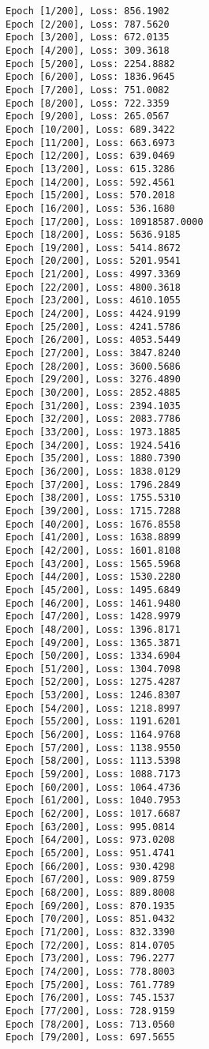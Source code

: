 \documentclass[11pt]{article}
\begin{document}
    \begin{Verbatim}[commandchars=\\\{\}]
Epoch [1/200], Loss: 856.1902
Epoch [2/200], Loss: 787.5620
Epoch [3/200], Loss: 672.0135
Epoch [4/200], Loss: 309.3618
Epoch [5/200], Loss: 2254.8882
Epoch [6/200], Loss: 1836.9645
Epoch [7/200], Loss: 751.0082
Epoch [8/200], Loss: 722.3359
Epoch [9/200], Loss: 265.0567
Epoch [10/200], Loss: 689.3422
Epoch [11/200], Loss: 663.6973
Epoch [12/200], Loss: 639.0469
Epoch [13/200], Loss: 615.3286
Epoch [14/200], Loss: 592.4561
Epoch [15/200], Loss: 570.2018
Epoch [16/200], Loss: 536.1680
Epoch [17/200], Loss: 10918587.0000
Epoch [18/200], Loss: 5636.9185
Epoch [19/200], Loss: 5414.8672
Epoch [20/200], Loss: 5201.9541
Epoch [21/200], Loss: 4997.3369
Epoch [22/200], Loss: 4800.3618
Epoch [23/200], Loss: 4610.1055
Epoch [24/200], Loss: 4424.9199
Epoch [25/200], Loss: 4241.5786
Epoch [26/200], Loss: 4053.5449
Epoch [27/200], Loss: 3847.8240
Epoch [28/200], Loss: 3600.5686
Epoch [29/200], Loss: 3276.4890
Epoch [30/200], Loss: 2852.4885
Epoch [31/200], Loss: 2394.1035
Epoch [32/200], Loss: 2083.7786
Epoch [33/200], Loss: 1973.1885
Epoch [34/200], Loss: 1924.5416
Epoch [35/200], Loss: 1880.7390
Epoch [36/200], Loss: 1838.0129
Epoch [37/200], Loss: 1796.2849
Epoch [38/200], Loss: 1755.5310
Epoch [39/200], Loss: 1715.7288
Epoch [40/200], Loss: 1676.8558
Epoch [41/200], Loss: 1638.8899
Epoch [42/200], Loss: 1601.8108
Epoch [43/200], Loss: 1565.5968
Epoch [44/200], Loss: 1530.2280
Epoch [45/200], Loss: 1495.6849
Epoch [46/200], Loss: 1461.9480
Epoch [47/200], Loss: 1428.9979
Epoch [48/200], Loss: 1396.8171
Epoch [49/200], Loss: 1365.3871
Epoch [50/200], Loss: 1334.6904
Epoch [51/200], Loss: 1304.7098
Epoch [52/200], Loss: 1275.4287
Epoch [53/200], Loss: 1246.8307
Epoch [54/200], Loss: 1218.8997
Epoch [55/200], Loss: 1191.6201
Epoch [56/200], Loss: 1164.9768
Epoch [57/200], Loss: 1138.9550
Epoch [58/200], Loss: 1113.5398
Epoch [59/200], Loss: 1088.7173
Epoch [60/200], Loss: 1064.4736
Epoch [61/200], Loss: 1040.7953
Epoch [62/200], Loss: 1017.6687
Epoch [63/200], Loss: 995.0814
Epoch [64/200], Loss: 973.0208
Epoch [65/200], Loss: 951.4741
Epoch [66/200], Loss: 930.4298
Epoch [67/200], Loss: 909.8759
Epoch [68/200], Loss: 889.8008
Epoch [69/200], Loss: 870.1935
Epoch [70/200], Loss: 851.0432
Epoch [71/200], Loss: 832.3390
Epoch [72/200], Loss: 814.0705
Epoch [73/200], Loss: 796.2277
Epoch [74/200], Loss: 778.8003
Epoch [75/200], Loss: 761.7789
Epoch [76/200], Loss: 745.1537
Epoch [77/200], Loss: 728.9159
Epoch [78/200], Loss: 713.0560
Epoch [79/200], Loss: 697.5655

\end{Verbatim}
\end{document}

